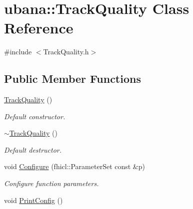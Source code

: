 \hypertarget{classubana_1_1TrackQuality}{\section{ubana\-:\-:Track\-Quality Class Reference}
\label{classubana_1_1TrackQuality}
}


{\ttfamily \#include $<$Track\-Quality.\-h$>$}

\subsection*{Public Member Functions}
\begin{DoxyCompactItemize}
\item 
\hypertarget{classubana_1_1TrackQuality_abffed8f958f75e68d808267094861ab0}{\hyperlink{classubana_1_1TrackQuality_abffed8f958f75e68d808267094861ab0}{Track\-Quality} ()}\label{classubana_1_1TrackQuality_abffed8f958f75e68d808267094861ab0}

\begin{DoxyCompactList}\small\item\em Default constructor. \end{DoxyCompactList}\item 
\hypertarget{classubana_1_1TrackQuality_a62e28a7dc1aee9bda05245e8ec5f2c59}{\hyperlink{classubana_1_1TrackQuality_a62e28a7dc1aee9bda05245e8ec5f2c59}{$\sim$\-Track\-Quality} ()}\label{classubana_1_1TrackQuality_a62e28a7dc1aee9bda05245e8ec5f2c59}

\begin{DoxyCompactList}\small\item\em Default destructor. \end{DoxyCompactList}\item 
\hypertarget{classubana_1_1TrackQuality_a96f8496645624aadfdfe0dcc800fde4c}{void \hyperlink{classubana_1_1TrackQuality_a96f8496645624aadfdfe0dcc800fde4c}{Configure} (fhicl\-::\-Parameter\-Set const \&p)}\label{classubana_1_1TrackQuality_a96f8496645624aadfdfe0dcc800fde4c}

\begin{DoxyCompactList}\small\item\em Configure function parameters. \end{DoxyCompactList}\item 
\hypertarget{classubana_1_1TrackQuality_aed0775802a41ff5a2ed7dd125eabc31b}{void \hyperlink{classubana_1_1TrackQuality_aed0775802a41ff5a2ed7dd125eabc31b}{Print\-Config} ()}\label{classubana_1_1TrackQuality_aed0775802a41ff5a2ed7dd125eabc31b}


\end{DoxyCompactItemize}
